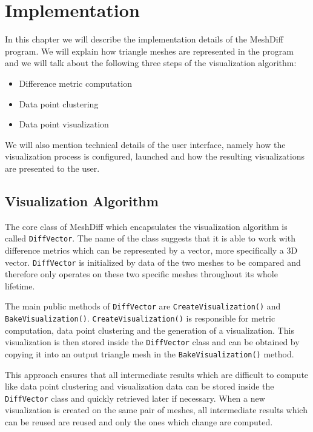 \chapter{Implementation}

In this chapter we will describe the implementation details of the MeshDiff program. We will explain how triangle meshes are represented in the program and we will talk about the following three steps of the visualization algorithm:

\begin{itemize}
\item Difference metric computation
\item Data point clustering
\item Data point visualization
\end{itemize}

We will also mention technical details of the user interface, namely how the visualization process is configured, launched and how the resulting visualizations are presented to the user.

\section{Visualization Algorithm}

The core class of MeshDiff which encapsulates the visualization algorithm is called \verb+DiffVector+. The name of the class suggests that it is able to work with difference metrics which can be represented by a vector, more specifically a 3D vector. \verb+DiffVector+ is initialized by data of the two meshes to be compared and therefore only operates on these two specific meshes throughout its whole lifetime.

The main public methods of \verb+DiffVector+ are \verb+CreateVisualization()+ and \verb+BakeVisualization()+. \verb+CreateVisualization()+ is responsible for metric computation, data point clustering and the generation of a visualization. This visualization is then stored inside the \verb+DiffVector+ class and can be obtained by copying it into an output triangle mesh in the \verb+BakeVisualization()+ method.

This approach ensures that all intermediate results which are difficult to compute like data point clustering and visualization data can be stored inside the \verb+DiffVector+ class and quickly retrieved later if necessary. When a new visualization is created on the same pair of meshes, all intermediate results which can be reused are reused and only the ones which change are computed.

